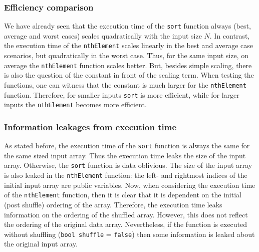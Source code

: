 \documentclass[11pt]{article}
\newcommand{\ct}[1]{\texttt{#1}}
\begin{document}

\subsubsection{Efficiency comparison} %
\label{ssub:efficiency_comparison}

We have already seen that the execution time of the \ct{sort} function always (best, average and worst cases) scales quadratically with the input size $N$. In contrast, the execution time of the \ct{nthElement} scales linearly in the best and average case scenarios, but quadratically in the worst case. Thus, for the same input size, on average the \ct{nthElement} function scales better. But, besides simple scaling, there is also the question of the constant in front of the scaling term. When testing the functions, one can witness that the constant is much larger for the \ct{nthElement} function. Therefore, for smaller inputs \ct{sort} is more efficient, while for larger inputs the \ct{nthElement} becomes more efficient.   


\subsubsection{Information leakages from execution time} %
\label{ssub:information_leakages_from_execution_time}

As stated before, the execution time of the \ct{sort} function is always the same for the same sized input array. Thus the execution time leaks the size of the input array. Otherwise, the \ct{sort} function is data oblivious. The size of the input array is also leaked in the \ct{nthElement} function: the left- and rightmost indices of the initial input array are public variables. Now, when considering the execution time of the \ct{nthElement} function, then it is clear that it is dependent on the initial (post shuffle) ordering of the array. Therefore, the execution time leaks information on the ordering of the shuffled array. However, this does not reflect the ordering of the original data array. Nevertheless, if the function is executed without shuffling (\ct{bool shuffle} = \ct{false}) then some information is leaked about the original input array.


\end{document}
